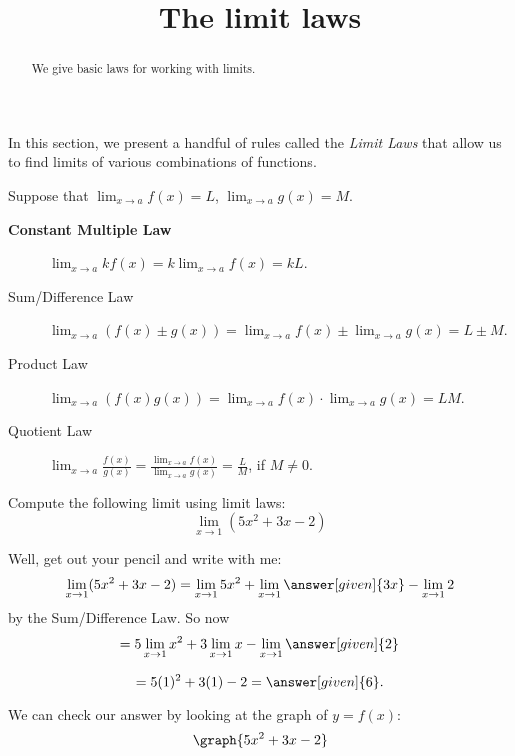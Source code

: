 \documentclass{ximera}
\title[Dig-In:]{The limit laws}
\begin{document}
\begin{abstract}
We give basic laws for working with limits. 
\end{abstract}
\maketitle

In this section, we present a handful of rules called the \textit{Limit Laws}
that allow us to find limits of various combinations of functions.

\begin{theorem}\label{theorem:limit-laws}
Suppose that $\displaystyle\lim_{x\to a}f(x)=L$, $\displaystyle\lim_{x\to a}g(x)=M$.
\begin{description}
\item[\textbf{Constant Multiple Law}] $\displaystyle\lim_{x\to a} kf(x) = k\displaystyle\lim_{x\to a}f(x)=kL$.
\item[Sum/Difference Law] $\displaystyle\lim_{x\to a} (f(x) \pm g(x)) =
  \lim_{x\to a}f(x) \pm \lim_{x\to a}g(x)=L \pm M$.
\item[Product Law]  $\displaystyle\lim_{x\to a} (f(x)g(x)) = \displaystyle\lim_{x\to
  a}f(x)\cdot\lim_{x\to a}g(x)=LM$.
\item[Quotient Law]  $\displaystyle\lim_{x\to a} \frac{f(x)}{g(x)} =
  \frac{\displaystyle\lim_{x\to a}f(x)}{\displaystyle\lim_{x\to a}g(x)}=\frac{L}{M}$, if
  $M\ne0$.
\end{description}
\label{thm:limit laws}
\end{theorem}


\begin{example}
  Compute the following limit using limit laws:
  \[
  \displaystyle\lim_{x\to 1}(5x^2+3x-2)
  \]
\begin{explanation}
  Well, get out your pencil and write with me:
  \[
  \displaystyle\lim_{x\to 1} (5x^2+3x-2) = \lim_{x\to 1} 5x^2 + \lim_{x\to 1} \answer[given]{3x} - \lim_{x\to 1}2
  \]
  by the Sum/Difference Law. So now
  \[
  = 5\displaystyle\lim_{x\to 1} x^2 + 3\lim_{x\to 1} x - \lim_{x\to 1}\answer[given]{2}
  \]
  
  \[
  = 5(1)^2 + 3(1) - 2 =\answer[given]{6}.
  \]
  \begin{prompt}
    We can check our answer by looking at the graph of $y=f(x)$:
    \[
    \graph{5x^2+3x-2}
    \]
  \end{prompt}
\end{explanation}  
\end{example}
\end{document}
